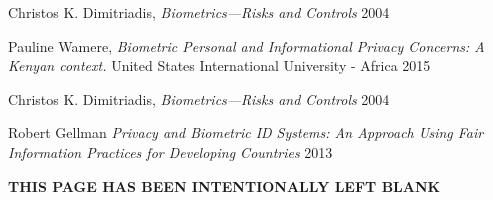 \documentclass[12pt]{report}
\begin{document}
\begin{thebibliography}{}

  Christos K. Dimitriadis,
  \emph{Biometrics—Risks and Controls}
  2004

  Pauline Wamere,
  \emph{Biometric Personal and Informational Privacy Concerns: A Kenyan context.}
  United States International University - Africa
  2015

  Christos K. Dimitriadis,
  \emph{Biometrics—Risks and Controls}
  2004


	Robert Gellman 
	\emph{Privacy and Biometric ID Systems: An Approach Using Fair Information Practices for
Developing Countries}
	2013

\iffalse

\bibitem{wikipedia}
  Wikipedia contributors,
  \emph{Wikipedia, The Free Encyclopedia}
  http://en.wikipedia.org/wiki/Encapsulation\_(networking)
  Accessed \today

\fi

\end{thebibliography}

\newpage
  \thispagestyle{empty}
  	\vspace*{\fill}
		\begin{center} 
		\textbf{THIS PAGE HAS BEEN INTENTIONALLY LEFT BLANK}
		\end{center}
	\vspace*{\fill}
\end{document}
